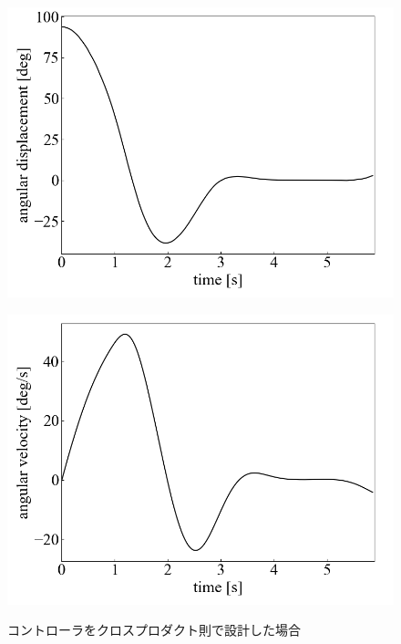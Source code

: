 \begin{figure}[H]
	\centering
	\begin{minipage}{0.43\columnwidth}
	  \centering
	  \includegraphics[width=\columnwidth]{./figure/crossdeg.png}
	  \label{fig:crossdeg}
	\end{minipage}
	\hspace{5mm}
	\begin{minipage}{0.43\columnwidth}
	  \centering
	  \includegraphics[width=\columnwidth]{./figure/crossdegpers.png}
	  \label{fig:crossdegpers}
	\end{minipage}
	\caption{コントローラをクロスプロダクト則で設計した場合}
	\label{fig:cross}
\end{figure}

